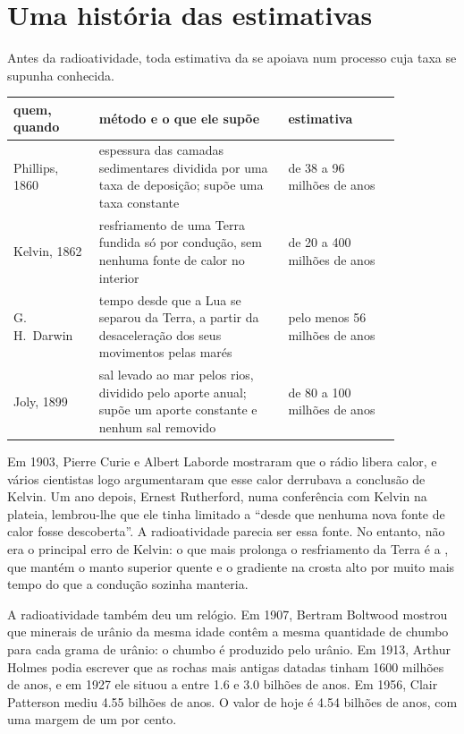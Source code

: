 \section{Uma história das estimativas}

Antes da radioatividade, toda estimativa da  se apoiava num
processo cuja taxa se supunha conhecida.

\begin{center}
\small
\begin{tabular}{|p{0.19\linewidth}|p{0.42\linewidth}|p{0.25\linewidth}|}
\hline
quem, quando & método e o que ele supõe & estimativa \\
\hline
Phillips, 1860 & espessura das camadas sedimentares dividida por uma taxa de deposição; supõe uma taxa constante & de 38 a 96 milhões de anos \\
Kelvin, 1862 & resfriamento de uma Terra fundida só por condução, sem nenhuma fonte de calor no interior & de 20 a 400 milhões de anos \\
G.\,H.~Darwin & tempo desde que a Lua se separou da Terra, a partir da desaceleração dos seus movimentos pelas marés & pelo menos 56 milhões de anos \\
Joly, 1899 & sal levado ao mar pelos rios, dividido pelo aporte anual; supõe um aporte constante e nenhum sal removido & de 80 a 100 milhões de anos \\
\hline
\end{tabular}
\end{center}

\begin{history}
Em 1903, Pierre Curie e Albert Laborde mostraram que o rádio libera calor, e
vários cientistas logo argumentaram que esse calor derrubava a conclusão de
Kelvin. Um ano depois, Ernest Rutherford, numa conferência com Kelvin na
plateia, lembrou-lhe que ele tinha limitado a  ``desde que
nenhuma nova fonte de calor fosse descoberta''. A radioatividade parecia ser
essa fonte. No entanto, não era o principal erro de Kelvin: o que mais
prolonga o resfriamento da Terra é a , que mantém o manto
superior quente e o gradiente na crosta alto por muito mais tempo do que a
condução sozinha manteria.
\end{history}

A radioatividade também deu um relógio. Em 1907, Bertram Boltwood mostrou
que minerais de urânio da mesma idade contêm a mesma quantidade de chumbo
para cada grama de urânio: o chumbo é produzido pelo urânio. Em 1913, Arthur
Holmes podia escrever que as rochas mais antigas datadas tinham \num{1600}
milhões de anos, e em 1927 ele situou a  entre 1.6 e 3.0
bilhões de anos. Em 1956, Clair Patterson mediu 4.55 bilhões de anos. O
valor de hoje é 4.54 bilhões de anos, com uma margem de um por cento.

